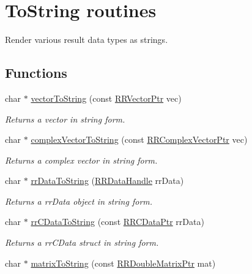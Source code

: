 \hypertarget{group__to_string}{\section{To\-String routines}
\label{group__to_string}
}


Render various result data types as strings.  


\subsection*{Functions}
\begin{DoxyCompactItemize}
\item 
char $\ast$ \hyperlink{group__to_string_ga64ab435eba89b0abf13ae8d86e0a679d}{vector\-To\-String} (const \hyperlink{rrc__types_8h_a3be72d6006034fd349f753d2bf441bf7}{R\-R\-Vector\-Ptr} vec)
\begin{DoxyCompactList}\small\item\em Returns a vector in string form. \end{DoxyCompactList}\item 
char $\ast$ \hyperlink{group__to_string_ga21993774c8d77e0c8988d94d75f8036c}{complex\-Vector\-To\-String} (const \hyperlink{rrc__types_8h_ae05c63419a6ca0575eb327fd04dae4b5}{R\-R\-Complex\-Vector\-Ptr} vec)
\begin{DoxyCompactList}\small\item\em Returns a complex vector in string form. \end{DoxyCompactList}\item 
char $\ast$ \hyperlink{group__to_string_gaca8178efe067c3fb79f06f8dae02d210}{rr\-Data\-To\-String} (\hyperlink{rrc__types_8h_ad0beb6fbdd576789fab9cead01d8b9e9}{R\-R\-Data\-Handle} rr\-Data)
\begin{DoxyCompactList}\small\item\em Returns a rr\-Data object in string form. \end{DoxyCompactList}\item 
char $\ast$ \hyperlink{group__to_string_ga505aeb10e21f0ef93770f7723aa12514}{rr\-C\-Data\-To\-String} (const \hyperlink{rrc__types_8h_a9da8b124eb9c3c0045f8926c6a420b4a}{R\-R\-C\-Data\-Ptr} rr\-Data)
\begin{DoxyCompactList}\small\item\em Returns a rr\-C\-Data struct in string form. \end{DoxyCompactList}\item 
char $\ast$ \hyperlink{group__to_string_gaf42846516870bc5cada2bbeb86f02be8}{matrix\-To\-String} (const \hyperlink{rrc__types_8h_ae586a879d30f0823087e42d93464b5dd}{R\-R\-Double\-Matrix\-Ptr} mat)

\end{DoxyCompactItemize}

